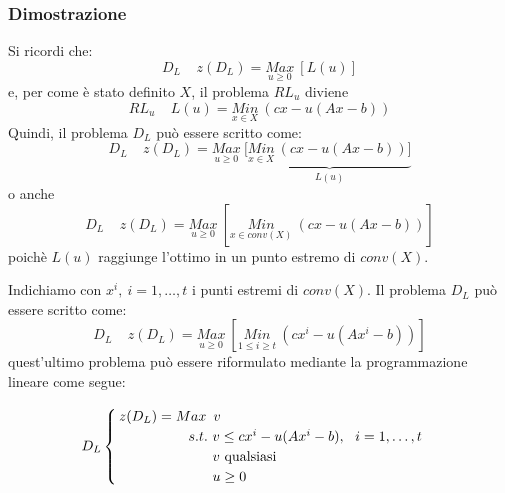 \subsubsection{Dimostrazione}
Si ricordi che:
\begin{equation*}
	D_{L}\ \ \ \ \ z(D_{L})=\underset{u\ge 0}{Max}\ [L(u)]
\end{equation*}
e, per come è stato definito $X$, il problema $RL_{u}$ diviene
\begin{equation*}
	RL_{u}\ \ \ \ \ L(u)=\underset{x\in X}{Min}\ (cx-u(Ax-b))
\end{equation*}
Quindi, il problema $D_{L}$ può essere scritto come:
\begin{equation*}
	D_{L}\ \ \ \ \ z(D_{L})=\underset{u\ge 0}{Max}\ [\underbrace{\underset{x\in X}{Min}\ (cx-u(Ax-b))]}_{L(u)}
\end{equation*}
o anche
\begin{equation*}
D_{L}\ \ \ \ \ z(D_{L})=\underset{u\ge 0}{Max}\ [\underset{x\in conv(X)}{Min}\ (cx-u(Ax-b))]
\end{equation*}
poichè $L(u)$ raggiunge l'ottimo in un punto estremo di $conv(X)$.

Indichiamo con $x^{i},\ i=1,\dots,t$ i punti estremi di $conv(X)$. Il problema $D_{L}$ può essere scritto come:
\begin{equation*}
	D_{L}\ \ \ \ \ z(D_{L})=\underset{u\ge 0}{Max}\ [\underset{1\le i\ge t}{Min}\ (cx^{i}-u(Ax^{i}-b))]
\end{equation*}
quest'ultimo problema può essere riformulato mediante la programmazione lineare come segue:

\begin{equation*}
	D_{L}
	\begin{cases}
	z(D_{L})=Max\ \,v \\
	\ \ \ \ \ \ \ \ \ \ \ \ \ \ \;s.t.\ v\le cx^{i}-u(Ax^{i}-b),\ \ i=1,\dots,t\\
	\ \ \ \ \ \ \ \ \ \ \ \ \ \ \ \ \ \ \ \ v\textnormal{ qualsiasi} \\
	\ \ \ \ \ \ \ \ \ \ \ \ \ \ \ \ \ \ \ \ u\ge 0
	\end{cases}
\end{equation*}

